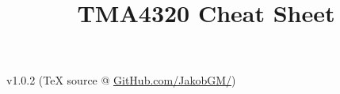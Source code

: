 \documentclass[6pt]{article}
\date{}
\title{TMA4320 Cheat Sheet}
\theoremstyle{definition}
\begin{document}
\begin{multicols*}{3}

\maketitle
v1.0.2 (TeX source @ \href{https://github.com/JakobGM/Numerical-Analysis-Cheat-Sheet}{GitHub.com/JakobGM/})






\end{multicols*}
\end{document}
